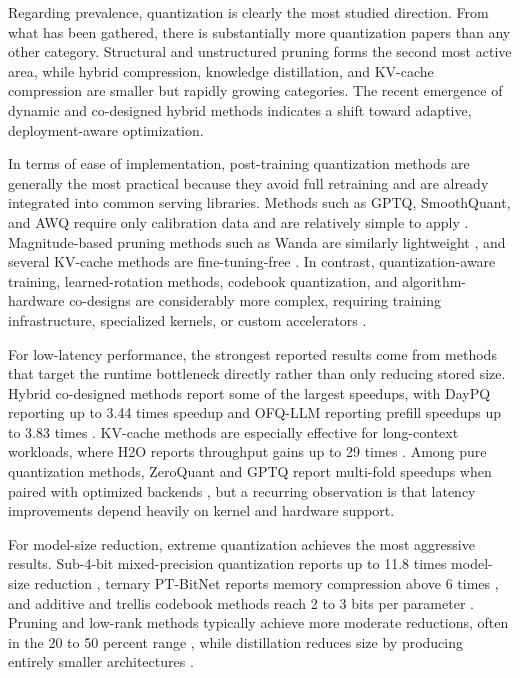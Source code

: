 \documentclass[
11pt, %
english, %
singlespacing, %
headsepline, %
]{MastersDoctoralThesis} %
\begin{document}
Regarding prevalence, quantization is clearly the most studied direction. From what has been gathered, there is substantially more quantization papers than any other category. Structural and unstructured pruning forms the second most active area, while hybrid compression, knowledge distillation, and KV-cache compression are smaller but rapidly growing categories. The recent emergence of dynamic and co-designed hybrid methods indicates a shift toward adaptive, deployment-aware optimization.

In terms of ease of implementation, post-training quantization methods are generally the most practical because they avoid full retraining and are already integrated into common serving libraries. Methods such as GPTQ, SmoothQuant, and AWQ require only calibration data and are relatively simple to apply \cite{frantar2023gptq,xiao2023smoothquant,lin2024awq}. Magnitude-based pruning methods such as Wanda are similarly lightweight \cite{sun2024wanda}, and several KV-cache methods are fine-tuning-free \cite{zhang2023h2o,li2024snapkv}. In contrast, quantization-aware training, learned-rotation methods, codebook quantization, and algorithm-hardware co-designs are considerably more complex, requiring training infrastructure, specialized kernels, or custom accelerators \cite{xu2026daypq,liu2025spinquant,tseng2024qtip,chen2025efficientqat}.

For low-latency performance, the strongest reported results come from methods that target the runtime bottleneck directly rather than only reducing stored size. Hybrid co-designed methods report some of the largest speedups, with DayPQ reporting up to 3.44 times speedup and OFQ-LLM reporting prefill speedups up to 3.83 times \cite{xu2026daypq,wang2025ofqllm}. KV-cache methods are especially effective for long-context workloads, where H2O reports throughput gains up to 29 times \cite{zhang2023h2o}. Among pure quantization methods, ZeroQuant and GPTQ report multi-fold speedups when paired with optimized backends \cite{yao2022zeroquant,frantar2023gptq}, but a recurring observation is that latency improvements depend heavily on kernel and hardware support.

For model-size reduction, extreme quantization achieves the most aggressive results. Sub-4-bit mixed-precision quantization reports up to 11.8 times model-size reduction \cite{cho2025sub4bit}, ternary PT-BitNet reports memory compression above 6 times \cite{survey2025ptbitnet}, and additive and trellis codebook methods reach 2 to 3 bits per parameter \cite{egiazarian2024aqlm,tseng2024qtip}. Pruning and low-rank methods typically achieve more moderate reductions, often in the 20 to 50 percent range \cite{ashkboos2024slicegpt,zhang2024loraprune,wang2025svdllm}, while distillation reduces size by producing entirely smaller architectures \cite{jiao2020tinybert,muralidharan2024minitron}.
\end{document}
